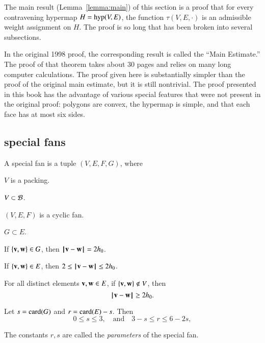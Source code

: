 The main result (Lemma~\ref{lemma:main}) of this section is a proof that for every contravening hypermap $H={\operatorname{hyp}}(V,E)$, the function $\tau(V,E,\cdot)$
is an admissible weight assignment on $H$.
The proof is so long that has been broken into several subsections.


\begin{remark}
In the original 1998 proof, the corresponding result
is called the ``Main Estimate.''  The proof of that 
theorem takes about 30 pages and relies on many
long computer calculations.  The proof given here
is substantially simpler than the proof of the original
main estimate, but
it is still nontrivial. The proof presented in this book has the advantage
of various special features that were not present in the original proof: 
polygons are convex, the hypermap
is simple, and that each face has at most six sides.
\end{remark}




\subsection{special fans}
%

\begin{definition}
A special fan is a tuple $(V,E,F,G)$, where
\begin{nomerate}
\item {} $V$ is a packing.
\item {} $V\subset {\mathcal B}$.
\item {} $(V,E,F)$ is a cyclic fan.
\item {} $G\subset E$.
\item {} If $\{{\mathbf v},{\mathbf w}\}\in G$, then ${\hskip0.1em|\hskip-0.15em|\hskip0.1em}{\mathbf v} - {\mathbf w}{\hskip0.1em|\hskip-0.15em|\hskip0.1em}=2{h_0}$.
\item {} If $\{{\mathbf v},{\mathbf w}\}\in E$, then $2\le {\hskip0.1em|\hskip-0.15em|\hskip0.1em}{\mathbf v} - {\mathbf w}{\hskip0.1em|\hskip-0.15em|\hskip0.1em}\le 2{h_0}$.
\item {} For all distinct elements ${\mathbf v},{\mathbf w}\in E$, if
$\{{\mathbf v},{\mathbf w}\}\not\in V$, then $${\hskip0.1em|\hskip-0.15em|\hskip0.1em}{\mathbf v} - {\mathbf w}{\hskip0.1em|\hskip-0.15em|\hskip0.1em}\ge 2{h_0}.$$
\item {} %
 Let      $s={\operatorname{card}}(G)$ and $r={\operatorname{card}}(E) - s$.  Then
$$0\le s \le 3,\quad\text{and}\quad3-s \le r \le 6 - 2s,$$
\end{nomerate}
The constants $r,s$ are called the {\it parameters} of the special fan.
\end{definition}



